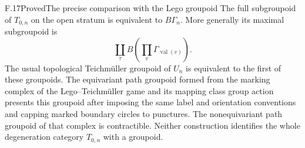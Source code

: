 \begin{statement}{F.17}{Proved}{The precise comparison with the Lego
groupoid}
The full subgroupoid of $T_{0,n}$ on the open stratum is equivalent
to $B\Gamma_n$.  More generally its maximal subgroupoid is
\[
 \coprod_{\tau} B\!\left(\prod_v\Gamma_{\operatorname{val}(v)}\right).
                                                               \tag{F.13}
\]
The usual topological Teichm\"uller groupoid of $U_n$ is equivalent
to the first of these groupoids.  The equivariant path groupoid formed
from the marking complex of the Lego--Teichm\"uller game and its mapping
class group action presents this groupoid after imposing the same label
and orientation conventions and capping marked boundary circles to
punctures.  The nonequivariant path groupoid of that complex is
contractible.  Neither construction identifies the whole degeneration
category $T_{0,n}$ with a groupoid.
\end{statement}
